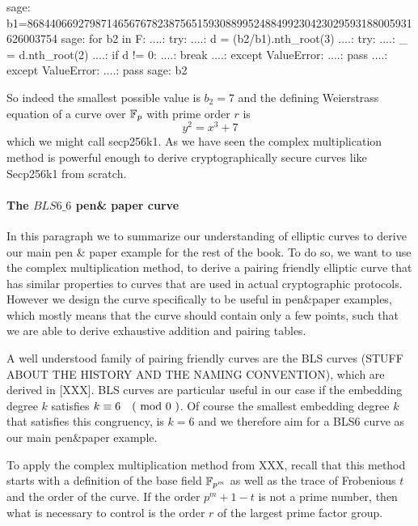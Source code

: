 \begin{example}
\begin{sagecommandline}
sage: b1=86844066927987146567678238756515930889952488499230423029593188005931626003754
sage: for b2 in F:
....:     try:
....:         d = (b2/b1).nth_root(3)
....:         try:
....:             _ = d.nth_root(2)
....:             if d != 0:
....:                 break
....:         except ValueError:
....:             pass
....:     except ValueError:
....:         pass
sage: b2
\end{sagecommandline}
So indeed the smallest possible value is $b_2=7$ and the defining Weierstrass equation of a curve over $\mathbb{F}_p$ with prime order $r$ is
$$
y^2 = x^3 + 7
$$
which we might call secp256k1. As we have seen the complex multiplication method is powerful enough to derive cryptographically secure curves like Secp256k1 from scratch.
\end{example}

\paragraph{The $BLS6\_6$ pen\& paper curve}
In this paragraph we to summarize our understanding of elliptic curves to derive our main pen \& paper example for the rest of the book. To do so, we want to use the complex multiplication method, to derive a pairing friendly elliptic curve that has similar properties to curves that are used in actual cryptographic protocols. However we design the curve specifically to be useful in pen\&{}paper examples, which mostly means that the curve should contain only a few points, such that we are able to derive exhaustive addition and pairing tables.

A well understood family of pairing friendly curves are the BLS curves (STUFF ABOUT THE HISTORY AND THE NAMING CONVENTION), which are derived in [XXX]. BLS curves are particular useful in our case if the embedding degree $k$ satisfies $k \equiv 6 \quad \text{( mod } 0 \text{ )}$. Of course the smallest embedding degree $k$ that satisfies this congruency, is $k=6$ and we therefore aim for a BLS6 curve as our main pen\&{}paper example.

To apply the complex multiplication method from XXX, recall that this method starts with a definition of the base field $\mathbb{F}_{p^m}$ as well as the trace of Frobenious $t$ and the order of the curve. If the order $p^m+1-t$ is not a prime number, then  what is necessary to control is the order $r$ of the largest prime factor group.

